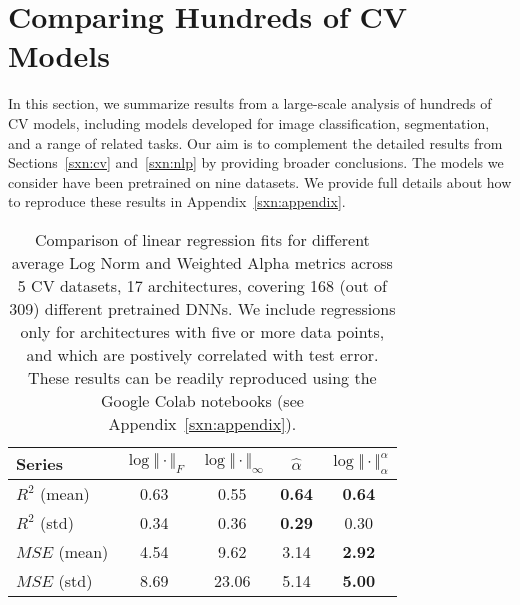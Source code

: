 \section{Comparing Hundreds of CV Models}
\label{sxn:all_cv_models}

In this section, we summarize results from a large-scale analysis of hundreds of CV models, including models developed for image 
classification, segmentation, and a range of related tasks.  
Our aim is to complement the detailed results from Sections~\ref{sxn:cv} and~\ref{sxn:nlp} by providing broader conclusions. %
The models we consider have been pretrained on nine datasets.   %
We provide full details about how to reproduce these results in Appendix~\ref{sxn:appendix}.

\begin{table}[t]
\small
\begin{center}
\begin{tabular}{|p{0.75in}|c|c|c|c|}
\hline
Series        & $\log\Vert\cdot\Vert_{F}$ & $\log\Vert\cdot\Vert_{\infty}$ & $\hat{\alpha}$ & $\log\Vert\cdot\Vert^{\alpha}_{\alpha}$ \\
\hline
$R^{2}$ (mean) & 0.63 &  0.55 & \textbf{0.64} & \textbf{0.64} \\
$R^{2}$ (std)  & 0.34 &  0.36 & \textbf{0.29} &          0.30 \\
\hline
$MSE$ (mean)   & 4.54 &  9.62 &          3.14 & \textbf{2.92} \\
$MSE$ (std)    & 8.69 & 23.06 &          5.14 & \textbf{5.00} \\
\hline
\end{tabular}
\end{center}
\caption{Comparison of linear regression fits for different average Log Norm and Weighted Alpha metrics across 5 CV datasets, 17 architectures, covering 168 (out of 309) different pretrained DNNs.  
         We include regressions only for architectures with five or more data points, and which are postively correlated with test error.
         These results can be readily reproduced using the Google Colab notebooks (see Appendix~\ref{sxn:appendix}). 
        }
\label{table:results}
\end{table}


